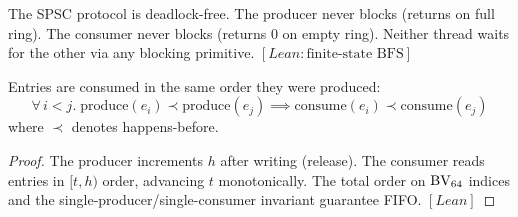 \begin{theorem}
\label{thm:deadlock-free}
The SPSC protocol is deadlock-free.
The producer never blocks (returns  on full ring).
The consumer never blocks (returns 0 on empty ring).
Neither thread waits for the other via any blocking primitive.
\quad$[\textit{Lean}: \text{finite-state BFS}]$
\end{theorem}

\begin{theorem}
\label{thm:fifo}
Entries are consumed in the same order they were produced:
\[
  \forall\, i < j.\; \text{produce}(e_i) \prec \text{produce}(e_j)
  \implies \text{consume}(e_i) \prec \text{consume}(e_j)
\]
where $\prec$ denotes happens-before.
\end{theorem}
\begin{proof}
The producer increments $h$ after writing (release).
The consumer reads entries in $[t, h)$ order, advancing $t$ monotonically.
The total order on $\mathrm{BV}_{64}$ indices and the single-producer/single-consumer
invariant guarantee FIFO.
$[\textit{Lean}]$
\end{proof}
